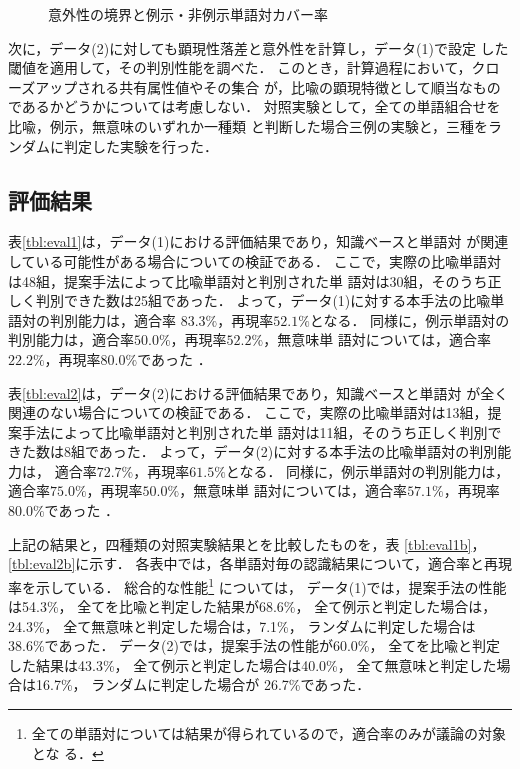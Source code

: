 \begin{figure}[tb]
  \begin{center}
     \caption{意外性の境界と例示・非例示単語対カバー率}
     \label{tbl:nov-cover}
  \end{center}
\end{figure}

次に，データ(2)に対しても顕現性落差と意外性を計算し，データ(1)で設定
した閾値を適用して，その判別性能を調べた．
このとき，計算過程において，クローズアップされる共有属性値やその集合
が，比喩の顕現特徴として順当なものであるかどうかについては考慮しない．
対照実験として，全ての単語組合せを比喩，例示，無意味のいずれか一種類
と判断した場合三例の実験と，三種をランダムに判定した実験を行った．

\subsection{評価結果}
表\ref{tbl:eval1}は，データ(1)における評価結果であり，知識ベースと単語対
が関連している可能性がある場合についての検証である．
ここで，実際の比喩単語対は48組，提案手法によって比喩単語対と判別された単
語対は30組，そのうち正しく判別できた数は25組であった．
よって，データ(1)に対する本手法の比喩単語対の判別能力は，適合率
$83.3\%$，再現率$52.1\%$となる．
同様に，例示単語対の判別能力は，適合率$50.0\%$，再現率$52.2\%$，無意味単
語対については，適合率$22.2\%$，再現率$80.0\%$であった
．

表\ref{tbl:eval2}は，データ(2)における評価結果であり，知識ベースと単語対
が全く関連のない場合についての検証である．
ここで，実際の比喩単語対は13組，提案手法によって比喩単語対と判別された単
語対は11組，そのうち正しく判別できた数は8組であった．
よって，データ(2)に対する本手法の比喩単語対の判別能力は，
適合率$72.7\%$，再現率$61.5\%$となる．
同様に，例示単語対の判別能力は，適合率$75.0\%$，再現率$50.0\%$，無意味単
語対については，適合率$57.1\%$，再現率$80.0\%$であった
．

上記の結果と，四種類の対照実験結果とを比較したものを，表
\ref{tbl:eval1b}，\ref{tbl:eval2b}に示す．
各表中では，各単語対毎の認識結果について，適合率と再現率を示している．
総合的な性能\footnote{
全ての単語対については結果が得られているので，適合率のみが議論の対象とな
る．
}
については，
データ(1)では，提案手法の性能は54.3\%，
全てを比喩と判定した結果が68.6\%，
全て例示と判定した場合は，24.3\%，
全て無意味と判定した場合は，7.1\%，
ランダムに判定した場合は 38.6\%であった．
データ(2)では，提案手法の性能が60.0\%，
全てを比喩と判定した結果は43.3\%，
全て例示と判定した場合は40.0\%，
全て無意味と判定した場合は16.7\%，
ランダムに判定した場合が 26.7\%であった．

